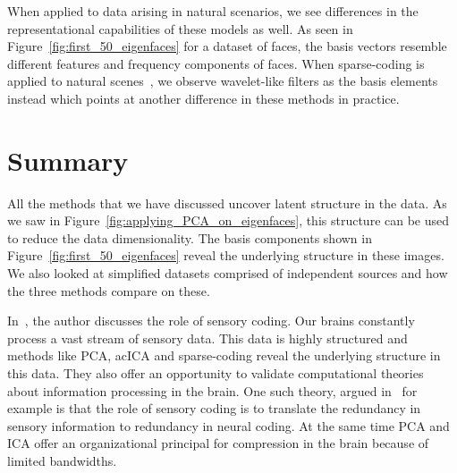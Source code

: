 \documentclass[10pt,onecolumn]{article}
\begin{document}
    When applied to data arising in natural scenarios, we see differences in the representational capabilities of these models as well.
    As seen in Figure~\ref{fig:first_50_eigenfaces} for a dataset of faces, the basis vectors resemble different features and frequency components of faces.
    When sparse-coding is applied to natural scenes~\cite{olshausen2004sparse}, we observe wavelet-like filters as the basis elements instead which points at another difference in these methods in practice.

    \section{Summary}
    \label{sec:summary}
    All the methods that we have discussed uncover latent structure in the data.
    As we saw in Figure~\ref{fig:applying_PCA_on_eigenfaces}, this structure can be used to reduce the data dimensionality.
    The basis components shown in Figure~\ref{fig:first_50_eigenfaces} reveal the underlying structure in these images.
    We also looked at simplified datasets comprised of independent sources and how the three methods compare on these.

    In~\cite{field1994goal}, the author discusses the role of sensory coding.
    Our brains constantly process a vast stream of sensory data.
    This data is highly structured and methods like \ac{PCA}, ac{ICA} and sparse-coding reveal the underlying structure in this data.
    They also offer an opportunity to validate computational theories about information processing in the brain.
    One such theory, argued in~\cite{field1994goal} for example is that the role of sensory coding is to translate the redundancy in sensory information to redundancy in neural coding.
    At the same time \ac{PCA} and \ac{ICA} offer an organizational principal for compression in the brain because of limited bandwidths.

    \setlength{\bibsep}{2pt}
    
    \footnotesize
    
\end{document}
